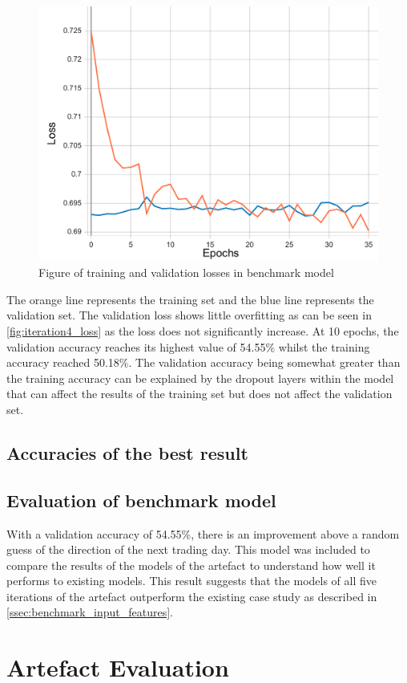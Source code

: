 \begin{figure}[ht]
    \centering
    \includegraphics[width=0.95\columnwidth]{figures/results/benchmark/benchmark_loss.pdf}
    \caption[Losses for benchmark model]{Figure of training and validation losses in benchmark model}
    \label{fig:benchmark_loss}
\end{figure}
\FloatBarrier

The orange line represents the training set and the blue line represents
the validation set. The validation loss shows little overfitting as can be seen in
\autoref{fig:iteration4_loss} as the loss does not significantly increase. At 10 epochs,
the validation accuracy reaches its highest value of 54.55\% whilst the training accuracy reached 50.18\%. The validation accuracy being somewhat greater than the
training accuracy can be explained by the dropout layers within the model that can affect the results of the training
set but does not affect the validation set. 

\subsection{Accuracies of the best result}


\subsection{Evaluation of benchmark model}
With a validation accuracy of 54.55\%, there is an improvement above a random guess of the direction
of the next trading day. This model was included to compare the results of the models of the artefact to understand
how well it performs to existing models.  This result suggests that the models of all five iterations of the artefact
outperform the existing case study as described in \autoref{ssec:benchmark_input_features}.


\section{Artefact Evaluation}

